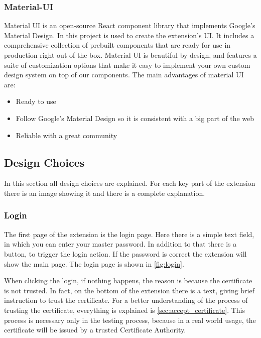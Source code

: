 \subsubsection {Material-UI}

Material UI is an open-source React component library that implements Google's Material Design. In this project is used to create the extension's UI.
It includes a comprehensive collection of prebuilt components that are ready for use in production right out of the box.
Material UI is beautiful by design, and features a suite of customization options that make it easy to implement your own custom design system on top of our components.
The main advantages of material UI are:

\begin{itemize}
    \item Ready to use
    \item Follow Google's Material Design so it is consistent with a big part of the web
    \item Reliable with a great community
\end{itemize}


\subsection {Design Choices}

In this section all design choices are explained. For each key part of the extension there is an image showing it and there is a complete explanation.

\subsubsection{Login}

The first page of the extension is the login page. Here there is a simple text field, in which you can enter your master password. In addition to that there is a button, to trigger the login action. If the password is correct the extension will show the main page.
The login page is shown in \autoref{fig:login}.

When clicking the login, if nothing happens, the reason is because the certificate is not trusted. In fact, on the bottom of the extension there is a text, giving brief instruction to trust the certificate. 
For a better understanding of the process of trusting the certificate, everything is explained is \autoref{sec:accept_certificate}.
This process is necessary only in the testing process, because in a real world usage, the certificate will be issued by a trusted Certificate Authority.


